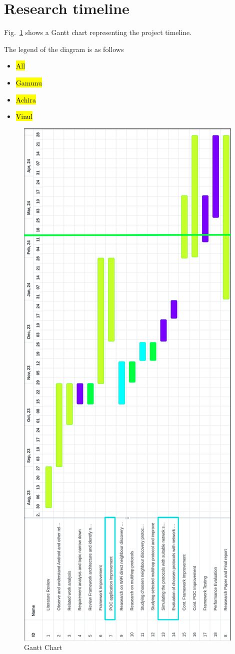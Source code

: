 \documentclass[12pt, conference, onecolumn, a4paper]{IEEEtran}
\begin{document}


\section{Research timeline}

Fig.~\ref{gantt} shows a Gantt chart representing the project timeline.

The legend of the diagram is as follows
\begin{itemize}
    \item \hl{All}
    \item \hl{Gamunu}
    \item \hl{Achira}
    \item \hl{Vinul}
\end{itemize}

\begin{figure}[htbp]
    \centerline{\includegraphics[height=1.4\textwidth]{imgs/gantt.png}}
    \caption{Gantt Chart}
    \label{gantt}
\end{figure}
\end{document}
